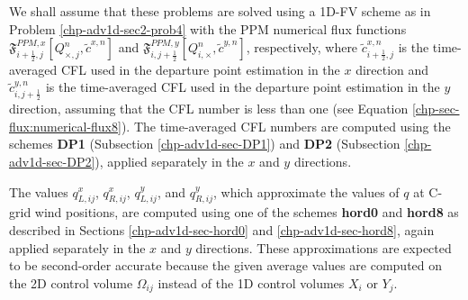 We shall assume that these problems are solved using a 1D-FV scheme as in Problem \ref{chp-adv1d-sec2-prob4}
with the PPM numerical flux functions $\mathfrak{F}_{i+\frac{1}{2},j}^{PPM,x}[Q^n_{\times,j},\tilde{c}^{x,n}]$ and
$\mathfrak{F}_{i,j+\frac{1}{2}}^{PPM,y}[Q^n_{i,\times},\tilde{c}^{y,n}]$, respectively,
where $\tilde{c}^{x,n}_{i+\frac{1}{2},j}$ is the time-averaged CFL used in the departure point estimation in the $x$ direction
and $\tilde{c}^{y,n}_{i,j+\frac{1}{2}}$ is the time-averaged CFL used in the departure point estimation in the $y$ direction,
assuming that the CFL number is less than one (see Equation \eqref{chp-sec-flux:numerical-flux8}).
The time-averaged CFL numbers are computed using the schemes 
\textbf{DP1} (Subsection \ref{chp-adv1d-sec-DP1}) and \textbf{DP2}
(Subsection \ref{chp-adv1d-sec-DP2}), applied separately in the $x$ and $y$ directions.

The values $q_{L,ij}^x$, $q_{R,ij}^x$, $q_{L,ij}^y$, and $q_{R,ij}^y$,
which approximate the values of $q$ at C-grid wind positions, are computed
using one of the schemes \textbf{hord0} and \textbf{hord8} as described
in Sections \ref{chp-adv1d-sec-hord0} and \ref{chp-adv1d-sec-hord8}, again
applied separately in the $x$ and $y$ directions.
These approximations are expected to be
second-order accurate because the given average values are computed on the
2D control volume $\Omega_{ij}$ instead of the 1D control volumes $X_i$ or $Y_j$.

